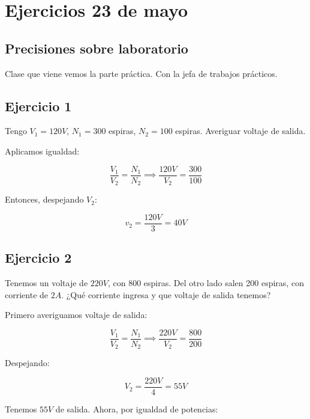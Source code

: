 \section{Ejercicios 23 de mayo}

\subsection{Precisiones sobre laboratorio}

Clase que viene vemos la parte práctica.
Con la jefa de trabajos prácticos.

\subsection{Ejercicio 1}

Tengo \(V_1 = 120 V\), \(N_1 = 300\) espiras, \(N_2 = 100\) espiras.
Averiguar voltaje de salida.

Aplicamos igualdad:

\begin{equation*}
    \frac{V_1}{V_2} = \frac{N_1}{N_2} \implies \frac{120 V}{V_2} = \frac{300}{100}
\end{equation*}

Entonces, despejando \(V_2\):

\begin{equation*}
    v_2 = \frac{120 V}{3} = \boxed{40 V}
\end{equation*}

\subsection{Ejercicio 2}

Tenemos un voltaje de \(220V\),
con 800 espiras.
Del otro lado salen 200 espiras, con corriente de \(2 A\).
¿Qué corriente ingresa y que voltaje de salida tenemos?

Primero averiguamos voltaje de salida:

\begin{equation*}
    \frac{V_1}{V_2} = \frac{N_1}{N_2} \implies \frac{220V}{V_2} = \frac{800}{200}
\end{equation*}

Despejando:

\begin{equation*}
    V_2 = \frac{220V}{4} = \boxed{55V}
\end{equation*}

Tenemos \(55V\) de salida. Ahora, por igualdad de potencias:

